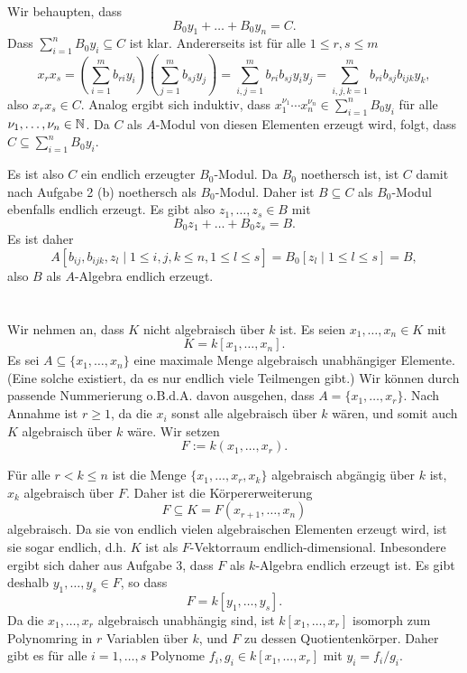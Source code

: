 \documentclass[a4paper,10pt]{article}
\begin{document}
Wir behaupten, dass
\[
 B_0 y_1 + \ldots + B_0 y_n = C.
\]
Dass $\sum_{i=1}^n B_0 y_i \subseteq C$ ist klar. Andererseits ist für alle $1 \leq r,s \leq m$
\[
 x_r x_s
 = \left( \sum_{i=1}^m b_{ri} y_i \right) \left( \sum_{j=1}^m b_{sj} y_j \right)
 = \sum_{i,j=1}^m b_{ri} b_{sj} y_i y_j
 = \sum_{i,j,k=1}^m b_{ri} b_{sj} b_{ijk} y_k,
\]
also $x_r x_s \in C$. Analog ergibt sich induktiv, dass $x_1^{\nu_1} \cdots x_n^{\nu_n} \in \sum_{i=1}^n B_0 y_i$ für alle $\nu_1, \ldots, \nu_n \in \mathbb{N}$. Da $C$ als $A$-Modul von diesen Elementen erzeugt wird, folgt, dass $C \subseteq \sum_{i=1}^n B_0 y_i$.

Es ist also $C$ ein endlich erzeugter $B_0$-Modul. Da $B_0$ noethersch ist, ist $C$ damit nach Aufgabe 2 (b) noethersch als $B_0$-Modul. Daher ist $B \subseteq C$ als $B_0$-Modul ebenfalls endlich erzeugt. Es gibt also $z_1, \ldots, z_s \in B$ mit
\[
 B_0 z_1 + \ldots + B_0 z_s = B.
\]
Es ist daher
\[
 A[b_{ij}, b_{ijk}, z_l \mid 1 \leq i,j,k \leq n, 1 \leq l \leq s ]
 = B_0 [z_l \mid 1 \leq l \leq s]
 = B,
\]
also $B$ als $A$-Algebra endlich erzeugt.





\section{}
Wir nehmen an, dass $K$ nicht algebraisch über $k$ ist. Es seien $x_1, \ldots, x_n \in K$ mit
\[
 K = k[x_1, \ldots, x_n].
\]
Es sei $A \subseteq \{x_1, \ldots, x_n\}$ eine maximale Menge algebraisch unabhängiger Elemente. (Eine solche existiert, da es nur endlich viele Teilmengen gibt.) Wir können durch passende Nummerierung o.B.d.A. davon ausgehen, dass $A = \{x_1, \ldots, x_r\}$. Nach Annahme ist $r \geq 1$, da die $x_i$ sonst alle algebraisch über $k$ wären, und somit auch $K$ algebraisch über $k$ wäre. Wir setzen
\[
 F := k(x_1, \ldots, x_r).
\]

Für alle $r < k \leq n$ ist die Menge $\{x_1, \ldots, x_r, x_k\}$ algebraisch abgängig über $k$ ist, $x_k$ algebraisch über $F$. Daher ist die Körpererweiterung
\[
 F \subseteq K = F(x_{r+1}, \ldots, x_n)
\]
algebraisch. Da sie von endlich vielen algebraischen Elementen erzeugt wird, ist sie sogar endlich, d.h. $K$ ist als $F$-Vektorraum endlich-dimensional. Inbesondere ergibt sich daher aus Aufgabe 3, dass $F$ als $k$-Algebra endlich erzeugt ist. Es gibt deshalb $y_1, \ldots, y_s \in F$, so dass
\[
 F = k[y_1, \ldots, y_s].
\]
Da die $x_1, \ldots, x_r$ algebraisch unabhängig sind, ist $k[x_1, \ldots, x_r]$ isomorph zum Polynomring in $r$ Variablen über $k$, und $F$ zu dessen Quotientenkörper. Daher gibt es für alle $i = 1, \ldots, s$ Polynome $f_i, g_i \in k[x_1, \ldots, x_r]$ mit $y_i = f_i/g_i$.
\end{document}
